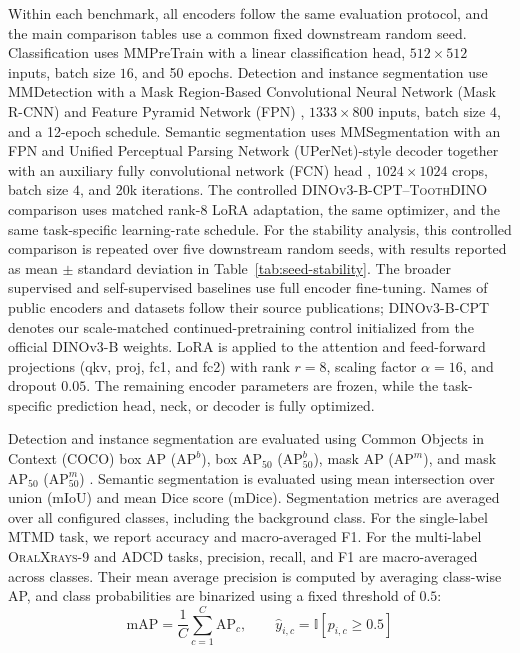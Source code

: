 \documentclass[conference]{IEEEtran}
\newcommand{\ToothDINO}{\textsc{ToothDINO}}
\newcommand{\DCT}{\textsc{DINOv3-B-CPT}}
\newcommand{\APb}{\ensuremath{\mathrm{AP}^{b}}}
\newcommand{\APm}{\ensuremath{\mathrm{AP}^{m}}}
\newcommand{\APbFifty}{\ensuremath{\mathrm{AP}^{b}_{50}}}
\newcommand{\APmFifty}{\ensuremath{\mathrm{AP}^{m}_{50}}}
\newcommand{\mIoU}{\ensuremath{\mathrm{mIoU}}}
\newcommand{\mDice}{\ensuremath{\mathrm{mDice}}}
\newcommand{\dataset}[1]{\textsc{#1}}
\begin{document}
Within each benchmark, all encoders follow the same evaluation
protocol, and the main comparison tables use a common fixed downstream
random seed. Classification uses MMPreTrain \cite{2023mmpretrain} with
a linear classification head, $512\times512$ inputs, batch size $16$,
and 50 epochs. Detection and instance segmentation use MMDetection
\cite{mmdetection} with a Mask Region-Based Convolutional Neural Network
(Mask R-CNN) and Feature Pyramid Network (FPN)
\cite{he2017maskrcnn,lin2017fpn}, $1333\times800$ inputs, batch size
$4$, and a 12-epoch schedule. Semantic segmentation uses MMSegmentation
\cite{mmseg2020} with an FPN and Unified Perceptual Parsing Network
(UPerNet)-style decoder together with an auxiliary fully convolutional
network (FCN) head \cite{lin2017fpn,xiao2018upernet},
$1024\times1024$ crops, batch size $4$, and 20k iterations. The
controlled \DCT{}--\ToothDINO{} comparison uses matched rank-$8$ LoRA
adaptation, the same optimizer, and the same task-specific
learning-rate schedule. For the stability analysis, this controlled
comparison is repeated over five downstream random seeds, with results
reported as mean $\pm$ standard deviation in
Table~\ref{tab:seed-stability}. The broader supervised and
self-supervised baselines use full encoder fine-tuning. Names of public
encoders and datasets follow their source publications; \DCT{} denotes
our scale-matched continued-pretraining control initialized from the
official DINOv3-B weights.
LoRA is applied to the attention and feed-forward projections
(\mbox{qkv}, \mbox{proj}, \mbox{fc1}, and \mbox{fc2}) with
rank $r=8$, scaling factor $\alpha=16$, and dropout $0.05$. The
remaining encoder parameters are frozen, while the task-specific
prediction head, neck, or decoder is fully optimized.


Detection and instance segmentation are evaluated using Common Objects in Context (COCO) box AP (\APb{}), box AP$_{50}$ (\APbFifty{}), mask AP (\APm{}), and mask AP$_{50}$ (\APmFifty{}) \cite{lin2014coco}. Semantic segmentation is evaluated using mean intersection over union (\mIoU{}) and mean Dice score (\mDice{}). Segmentation metrics are averaged over all configured classes, including the background class. For the single-label \dataset{MTMD} task, we report accuracy and macro-averaged F1. For the multi-label \dataset{OralXrays-9} and \dataset{ADCD} tasks, precision, recall, and F1 are macro-averaged across classes. Their mean average precision is computed by averaging class-wise AP, and class probabilities are binarized using a fixed threshold of $0.5$:
\begin{equation}
\label{eq:classification-metrics}
\mathrm{mAP}
=
\frac{1}{C}\sum_{c=1}^{C}\mathrm{AP}_{c},
\qquad
\hat{y}_{i,c}
=
\mathbb{I}\!\left[p_{i,c}\geq0.5\right]
\end{equation}
\end{document}
